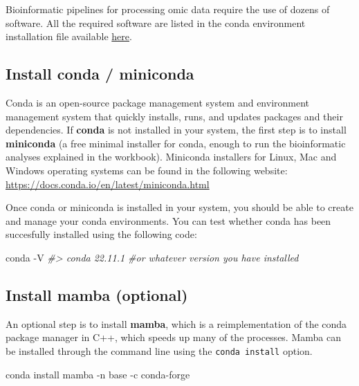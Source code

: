 \documentclass[
]{book}
\newenvironment{Shaded}{\begin{snugshade}}{\end{snugshade}}
\newcommand{\AttributeTok}[1]{\textcolor[rgb]{0.77,0.63,0.00}{#1}}
\newcommand{\CommentTok}[1]{\textcolor[rgb]{0.56,0.35,0.01}{\textit{#1}}}
\newcommand{\ExtensionTok}[1]{#1}
\newcommand{\NormalTok}[1]{#1}
\begin{document}
Bioinformatic pipelines for processing omic data require the use of dozens of software. All the required software are listed in the conda environment installation file available \href{https://raw.githubusercontent.com/holo-omics/holo-omics.github.io/main/bin/holo-omics-env.yaml}{here}.

\hypertarget{install-conda-miniconda}{%
\subsection*{Install conda / miniconda}\label{install-conda-miniconda}}

Conda is an open-source package management system and environment management system that quickly installs, runs, and updates packages and their dependencies. If \textbf{conda} is not installed in your system, the first step is to install \textbf{miniconda} (a free minimal installer for conda, enough to run the bioinformatic analyses explained in the workbook). Miniconda installers for Linux, Mac and Windows operating systems can be found in the following website:
\url{https://docs.conda.io/en/latest/miniconda.html}

Once conda or miniconda is installed in your system, you should be able to create and manage your conda environments. You can test whether conda has been succesfully installed using the following code:

\begin{Shaded}
\begin{Highlighting}[]
\ExtensionTok{conda} \AttributeTok{{-}V}
\CommentTok{\#\textgreater{} conda 22.11.1 \#or whatever version you have installed}
\end{Highlighting}
\end{Shaded}

\hypertarget{install-mamba}{%
\subsection*{Install mamba (optional)}\label{install-mamba}}

An optional step is to install \textbf{mamba}, which is a reimplementation of the conda package manager in C++, which speeds up many of the processes. Mamba can be installed through the command line using the \texttt{conda\ install} option.

\begin{Shaded}
\begin{Highlighting}[]
\ExtensionTok{conda}\NormalTok{ install mamba }\AttributeTok{{-}n}\NormalTok{ base }\AttributeTok{{-}c}\NormalTok{ conda{-}forge}
\end{Highlighting}
\end{Shaded}
\end{document}
